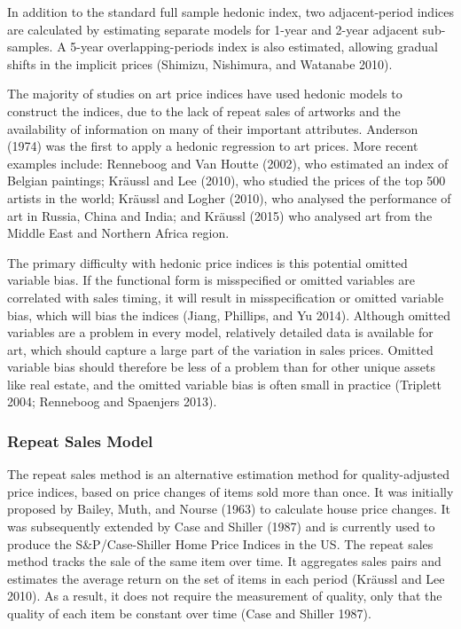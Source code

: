 \documentclass[]{elsarticle} %
\begin{document}
In addition to the standard full sample hedonic index, two
adjacent-period indices are calculated by estimating separate models for
1-year and 2-year adjacent sub-samples. A 5-year overlapping-periods
index is also estimated, allowing gradual shifts in the implicit prices
(Shimizu, Nishimura, and Watanabe 2010).

The majority of studies on art price indices have used hedonic models to
construct the indices, due to the lack of repeat sales of artworks and
the availability of information on many of their important attributes.
Anderson (1974) was the first to apply a hedonic regression to art
prices. More recent examples include: Renneboog and Van Houtte (2002),
who estimated an index of Belgian paintings; Kräussl and Lee (2010), who
studied the prices of the top 500 artists in the world; Kräussl and
Logher (2010), who analysed the performance of art in Russia, China and
India; and Kräussl (2015) who analysed art from the Middle East and
Northern Africa region.

The primary difficulty with hedonic price indices is this potential
omitted variable bias. If the functional form is misspecified or omitted
variables are correlated with sales timing, it will result in
misspecification or omitted variable bias, which will bias the indices
(Jiang, Phillips, and Yu 2014). Although omitted variables are a problem
in every model, relatively detailed data is available for art, which
should capture a large part of the variation in sales prices. Omitted
variable bias should therefore be less of a problem than for other
unique assets like real estate, and the omitted variable bias is often
small in practice (Triplett 2004; Renneboog and Spaenjers 2013).

\subsubsection{Repeat Sales Model}\label{repeat-sales-model}

The repeat sales method is an alternative estimation method for
quality-adjusted price indices, based on price changes of items sold
more than once. It was initially proposed by Bailey, Muth, and Nourse
(1963) to calculate house price changes. It was subsequently extended by
Case and Shiller (1987) and is currently used to produce the
S\&P/Case-Shiller Home Price Indices in the US. The repeat sales method
tracks the sale of the same item over time. It aggregates sales pairs
and estimates the average return on the set of items in each period
(Kräussl and Lee 2010). As a result, it does not require the measurement
of quality, only that the quality of each item be constant over time
(Case and Shiller 1987).
\end{document}
